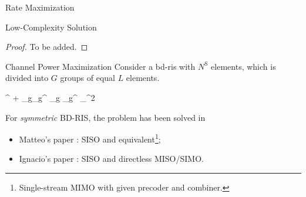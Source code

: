 \documentclass[journal]{IEEEtran}
\begin{document}
\begin{section}{Rate Maximization}
\begin{subsection}{Low-Complexity Solution}
		\begin{proof}
			To be added.
		\end{proof}
	\end{subsection}




	\begin{subsection}{Channel Power Maximization}
		Consider a \gls{bd}-\gls{ris} with $N^\mathrm{S}$ elements, which is divided into $G$ groups of equal $L$ elements.
		\begin{maxi!}
			{\scriptstyle{\mathbf{\Theta}}}{\left\lVert {}^ + \sum_g\nolimits {}_g^ \mathbf{\Theta}_g _g^ \right\rVert _^2}{\label{op:pc_power}}{}
		\end{maxi!}
		For \emph{symmetric} BD-RIS, the problem has been solved in
		\begin{itemize}
			\item Matteo's paper \cite{Nerini2023}: SISO and equivalent\footnote{Single-stream MIMO with given precoder and combiner.};
			\item Ignacio's paper \cite{Santamaria2023}: SISO and directless MISO/SIMO.
		\end{itemize}


\end{subsection}
\end{section}
\end{document}
